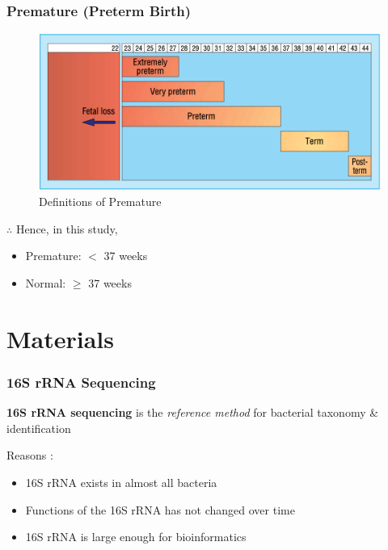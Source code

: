 \documentclass{beamer}
\begin{document}
    \begin{frame}
        \frametitle{Premature (Preterm Birth)}

        \begin{figure}[h!]
            \includegraphics[width=0.6 \linewidth]{figures/premature.png}
            \caption{Definitions of Premature \protect \cite{premature1}}
        \end{figure}

        $\therefore$ Hence, in this study,
        \begin{itemize}
            \item Premature: $<$ 37 weeks
            \item Normal: $\ge$ 37 weeks
        \end{itemize}
    \end{frame}

    \section{Materials}
    \begin{frame}
        \frametitle{16S rRNA Sequencing}

        \textbf{16S rRNA sequencing} is the \textit{reference method} for bacterial taxonomy \& identification \cite{16S1}

        Reasons \cite{16S2}:
        \begin{itemize}
            \item 16S rRNA exists in almost all bacteria
            \item Functions of the 16S rRNA has not changed over time
            \item 16S rRNA is large enough for bioinformatics
        \end{itemize}
    \end{frame}
\end{document}
